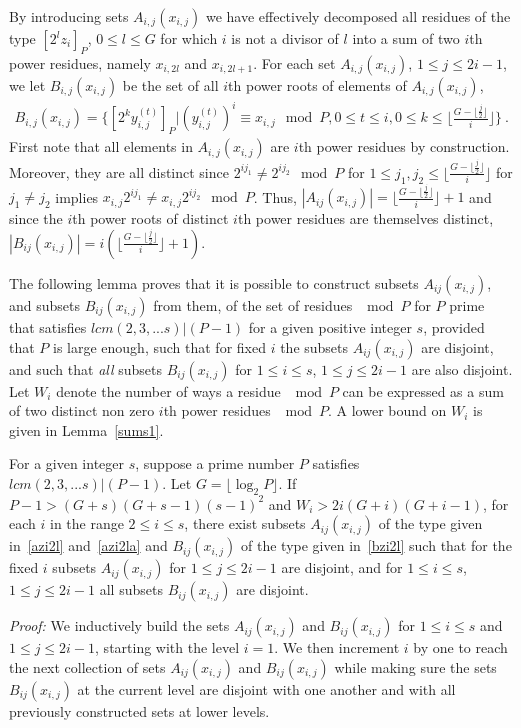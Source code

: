 By introducing sets $A_{i,j}(x_{i,j})$ we have effectively
decomposed all residues of the type $[2^lz_i]_P$, $0 \leq l \leq
G$ for which $i$ is not a divisor of $l$ into a sum of two $i$th
power residues, namely $x_{i,2l}$ and $x_{i,2l+1}$. For each set
$A_{i,j}(x_{i,j})$, $1 \leq j \leq 2i-1$, we let
$B_{i,j}(x_{i,j})$ be the set of all $i$th power roots of elements
of $A_{i,j}(x_{i,j})$,
\begin{eqnarray}\label{bzi2l}
B_{i,j}(x_{i,j}) =\{ [2^{k}y_{i,j}^{(t)}]_P| (y_{i,j}^{(t)})^i
\equiv x_{i,j} \mod P, 0 \leq t \leq i, 0 \leq k \leq \lfloor
\frac{G-\lfloor \frac{j}{2} \rfloor}{i} \rfloor \}~.
\end{eqnarray}
First note that all elements in $A_{i,j}(x_{i,j})$ are $i$th power
residues by construction. Moreover, they are all distinct since
$2^{ij_1} \neq 2^{ij_2} \mod P$ for $1 \leq j_1,j_2 \leq \lfloor
\frac{G-\lfloor\frac{j}{2} \rfloor}{i} \rfloor$ for $j_1\neq j_2$
implies $x_{i,j}2^{ij_1} \neq x_{i,j}2^{ij_2} \mod P$. Thus,
$|A_{ij}(x_{i,j})|=\lfloor \frac{G-\lfloor \frac{j}{2}\rfloor}{i}
\rfloor+1$ and since the $i$th power roots of distinct $i$th power
residues are themselves distinct,
$|B_{ij}(x_{i,j})|=i\left(\lfloor \frac{G-\lfloor
\frac{j}{2}\rfloor}{i} \rfloor+1\right)$.



The following lemma proves that it is possible to construct
subsets $A_{ij}(x_{i,j})$, and subsets $B_{ij}(x_{i,j})$ from
them, of the set of residues $\mod P$ for $P$ prime that satisfies
$lcm(2,3,...s) | (P-1)$ for a given positive integer $s$, provided
that $P$ is large enough, such that for fixed $i$ the subsets
$A_{ij}(x_{i,j})$ are disjoint, and such that \emph{all} subsets
$B_{ij}(x_{i,j})$ for $1 \leq i \leq s$, $1 \leq j \leq 2i-1$ are
also disjoint. Let $W_i$ denote the number of ways a residue $\mod
P$ can be expressed as a sum of two distinct non zero $i$th power
residues $\mod P$. A lower bound on $W_i$ is given in
Lemma~\ref{sums1}.
\begin{lemma}\label{lemmaw} For a given integer $s$, suppose a prime number $P$ satisfies $lcm(2,3,...s) |
(P-1)$. Let $G =\lfloor \log_2{P}\rfloor$. If $P-1 >
(G+s)(G+s-1)(s-1)^2$ and $W_i
> 2i(G+i)(G+i-1)$, for each $i$ in the range $2 \leq i \leq
s$, there exist subsets $A_{ij}(x_{i,j})$ of the type given
in~\eqref{azi2l} and~\eqref{azi2la} and $B_{ij}(x_{i,j})$ of the
type given in~\eqref{bzi2l}
 such that for the fixed $i$ subsets $A_{ij}(x_{i,j})$ for $1 \leq j \leq 2i-1$ are disjoint, and
for $1 \leq i \leq s$, $1 \leq j \leq 2i-1$ all subsets
$B_{ij}(x_{i,j})$ are disjoint.
\end{lemma}
\noindent \textit{Proof:} We inductively build the sets
$A_{ij}(x_{i,j})$ and $B_{ij}(x_{i,j})$ for $1 \leq i \leq s$ and
$1 \leq j \leq 2i-1$, starting with the level $i=1$. We then
increment $i$ by one to reach the next collection of sets
$A_{ij}(x_{i,j})$ and $B_{ij}(x_{i,j})$ while making sure the sets
$B_{ij}(x_{i,j})$ at the current level are disjoint with one
another and with all previously constructed sets at lower levels.

